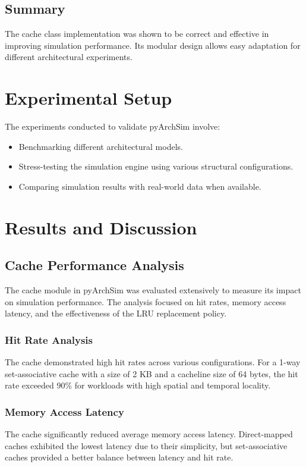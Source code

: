 \documentclass[12pt,a4paper]{report}
\begin{document}
\subsection{Summary}
The cache class implementation was shown to be correct and effective in improving simulation performance. Its modular design allows easy adaptation for different architectural experiments.

\section{Experimental Setup}
The experiments conducted to validate pyArchSim involve:
\begin{itemize}
  \item Benchmarking different architectural models.
  \item Stress-testing the simulation engine using various structural configurations.
  \item Comparing simulation results with real-world data when available.
\end{itemize}

\section{Results and Discussion}
\subsection{Cache Performance Analysis}
The cache module in pyArchSim was evaluated extensively to measure its impact on simulation performance. The analysis focused on hit rates, memory access latency, and the effectiveness of the LRU replacement policy.

\subsubsection{Hit Rate Analysis}
The cache demonstrated high hit rates across various configurations. For a 1-way set-associative cache with a size of 2 KB and a cacheline size of 64 bytes, the hit rate exceeded 90\% for workloads with high spatial and temporal locality.

\subsubsection{Memory Access Latency}
The cache significantly reduced average memory access latency. Direct-mapped caches exhibited the lowest latency due to their simplicity, but set-associative caches provided a better balance between latency and hit rate.
\end{document}
